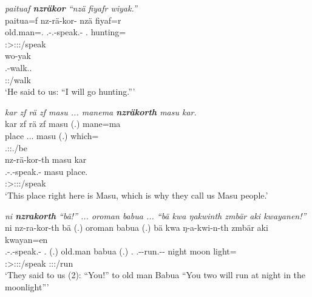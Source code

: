 \begin{exe}
	\ex \emph{paituaf \textbf{nzräkor} ``nzä fiyafr wiyak.''}\\
	\glll paitua=f nz-rä-kor-\Zero{} nzä fiyaf=r\\
	old.man=\Erg.\Sg{} \Fnsg.\Bet-\Irr.\Ndu-speak.\Rs-\Stsg{} \Fsg.\Abs{} hunting=\Purp{}\\
	{} \footnotesize{\Stsg:\Sbj>\Fpl:\Obj:\Irr:\Pfv/speak} {} {}\\
	\sn
	\glll wo-yak\\
	\Fsg.\Alph-walk.\Ext.\Ndu\\
	\footnotesize{\Fsg:\Nonpast:\Ipfv/walk}\\
	\trans `He said to us: ``I will go hunting.''' 
	\label{ex249}
\end{exe}
\begin{exe}
	\ex \emph{kar zf rä zf masu ... manema \textbf{nzräkorth} masu kar.}\\
	\glll kar zf rä zf masu (.) mane=ma\\
	place \Imm{} \Tsg.\F.\Cop.\Ndu{} \Imm{} masu (.) which=\Char{}\\
	{} {} \footnotesize{\Tsg.\F:\Sbj:\Nonpast.\Ipfv/be} {} {} {} {}\\
	\sn
	\glll
	nz-rä-kor-th masu kar\\
	\Fnsg.\Bet-\Irr.\Ndu-speak.\Rs-\Stnsg{} masu place.\\
	\footnotesize{\Stpl:\Sbj>\Fpl:\Obj:\Irr:\Pfv/speak} {} {}\\
	\trans `This place right here is Masu, which is why they call us Masu people.'\\ 
	\label{ex250}
\end{exe}
\begin{exe}
	\ex \emph{ni \textbf{nzrakorth} ``bä!'' ... oroman babua ... ``bä kwa ŋakwinth zmbär aki kwayanen!''}\\
	\glll ni nz-ra-kor-th bä (.) oroman babua (.) bä kwa\hspace*{2cm} ŋ-a-kwi-n-th zmbär aki kwayan=en\\
	\Fnsg{} \Fnsg.\Bet-\Irr.\Du-speak.\Rs-\Stnsg{} \Second.\Abs{} (.) old.man babua (.) \Second.\Abs{} \Fut{} \M.\Alph-\Vc-run.\Ext-\Du-\Stnsg{} night moon light=\Loc\\
	{} \footnotesize{\Stpl:\Sbj>\Fdu:\Obj:\Irr:\Pfv/speak} {} {} {} {} {} {} {} \footnotesize{\Stdu:\Sbj:\Nonpast:\Ipfv/run} {} {} {}\\
	\trans `They said to us (2): ``You!'' to old man Babua ``You two will run at night in the moonlight''' 
	\label{ex247}
\end{exe}

